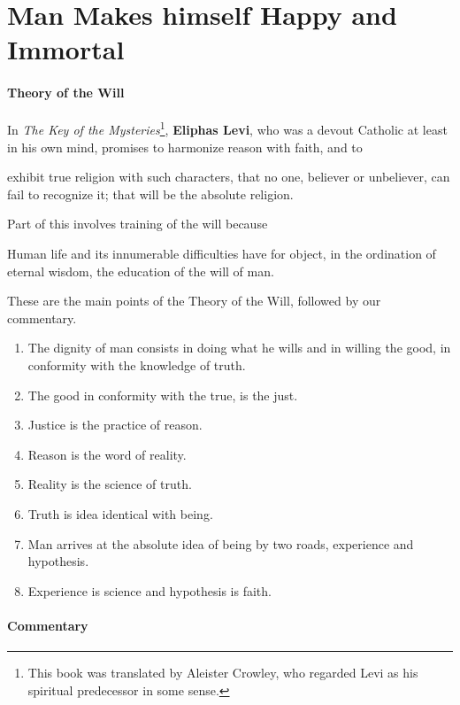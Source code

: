 \section{Man Makes himself Happy and Immortal}

\paragraph{Theory of the Will}

In \emph{The Key of the Mysteries}\footnote{This book was translated by Aleister Crowley, who regarded Levi as his spiritual predecessor in some sense.}, \textbf{Eliphas Levi}, who was a devout Catholic at least in his own mind, promises to harmonize reason with faith, and to

\begin{quotex}
exhibit true religion with such characters, that no one, believer or unbeliever, can fail to recognize it; that will be the absolute religion.
\end{quotex}

Part of this involves training of the will because

\begin{quotex}
Human life and its innumerable difficulties have for object, in the ordination of eternal wisdom, the education of the will of man.
\end{quotex}

These are the main points of the Theory of the Will, followed by our commentary.

\begin{enumerate}
\item The dignity of man consists in doing what he wills and in willing the good, in conformity with the knowledge of truth.
\item The good in conformity with the true, is the just.
\item Justice is the practice of reason.
\item Reason is the word of reality.
\item Reality is the science of truth.
\item Truth is idea identical with being.
\item Man arrives at the absolute idea of being by two roads, experience and hypothesis.
\item Experience is science and hypothesis is faith.
\end{enumerate}

\paragraph{Commentary}


